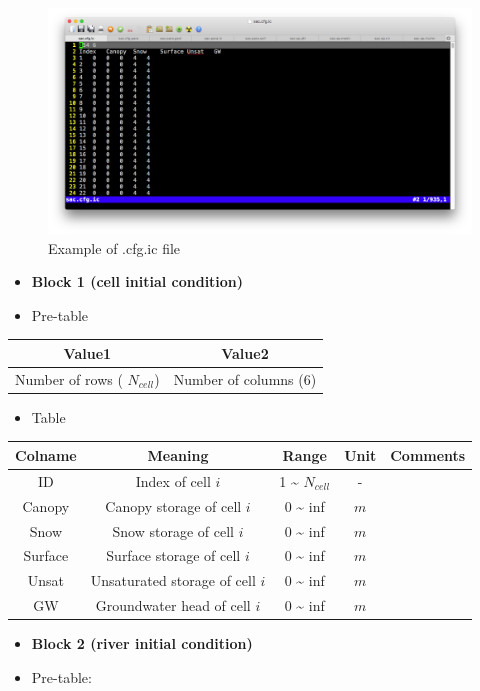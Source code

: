 \documentclass[]{scrbook}
\providecommand{\tightlist}{%
  \setlength{\itemsep}{0pt}\setlength{\parskip}{0pt}}
\begin{document}
\begin{figure}
\centering
\includegraphics{Fig/IO/cfg.ic.png}
\caption{Example of .cfg.ic file}
\end{figure}

\begin{itemize}
\item
  \textbf{Block 1 (cell initial condition)}
\item
  Pre-table
\end{itemize}

\begin{longtable}[]{@{}cc@{}}
\toprule
Value1 & Value2\tabularnewline
\midrule
\endhead
Number of rows ( \(N_{cell}\)) & Number of columns
(\(6\))\tabularnewline
\bottomrule
\end{longtable}

\begin{itemize}
\tightlist
\item
  Table
\end{itemize}

\begin{longtable}[]{@{}ccccc@{}}
\toprule
Colname & Meaning & Range & Unit & Comments\tabularnewline
\midrule
\endhead
ID & Index of cell \(i\) & 1 \textasciitilde{} \(N_{cell}\) & -
&\tabularnewline
Canopy & Canopy storage of cell \(i\) & 0 \textasciitilde{} inf & \(m\)
&\tabularnewline
Snow & Snow storage of cell \(i\) & 0 \textasciitilde{} inf & \(m\)
&\tabularnewline
Surface & Surface storage of cell \(i\) & 0 \textasciitilde{} inf &
\(m\) &\tabularnewline
Unsat & Unsaturated storage of cell \(i\) & 0 \textasciitilde{} inf &
\(m\) &\tabularnewline
GW & Groundwater head of cell \(i\) & 0 \textasciitilde{} inf & \(m\)
&\tabularnewline
\bottomrule
\end{longtable}

\begin{itemize}
\item
  \textbf{Block 2 (river initial condition)}
\item
  Pre-table:
\end{itemize}
\end{document}

